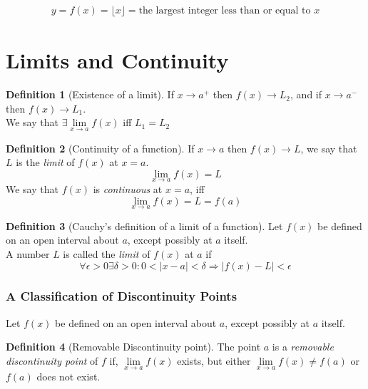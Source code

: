 \documentclass[fleqn]{article}
\theoremstyle{definition}
\newtheorem{definition}{Definition}
\theoremstyle{theorem}
\theoremstyle{remark}
\begin{document}
\begin{align}
	y = f(x) = \lfloor x \rfloor = \text{the largest integer less than or equal to }x
\end{align}

\newpage
\part{Limits and Continuity}

\begin{definition}[Existence of a limit]
	If $x \rightarrow a^+$ then $f(x) \rightarrow L_2$, and if $x \rightarrow a^-$ then $f(x) \rightarrow L_1$.\\
	We say that $\exists \lim\limits_{x \rightarrow a} f(x)$ iff $L_1 = L_2$
\end{definition}

\begin{definition}[Continuity of a function]
	If $x \rightarrow a$ then $f(x) \rightarrow L$, we say that $L$ is the \emph{limit} of $f(x)$ at $x = a$.
	\begin{equation*}
		\lim\limits_{x \rightarrow a} f(x) = L
	\end{equation*}
	We say that $f(x)$ is \emph{continuous} at $x = a$, iff
	\begin{equation*}
		\lim\limits_{x \rightarrow a} f(x) = L = f(a)
	\end{equation*}
\end{definition}

\begin{definition}[Cauchy's definition of a limit of a function]
	Let $f(x)$ be defined on an open interval about $a$, except possibly at $a$ itself.\\
	A number $L$ is called the \emph{limit} of $f(x)$ at $a$ if
	\begin{equation}
		\forall \epsilon > 0 \exists \delta > 0 : 0 < |x - a| < \delta \Rightarrow |f(x) - L| < \epsilon
	\end{equation}
\end{definition}

\section{A Classification of Discontinuity Points}

Let $f(x)$ be defined on an open interval about $a$, except possibly at $a$ itself.

\begin{definition}[Removable Discontinuity point]
	The point $a$ is a \emph{removable discontinuity point} of $f$ if, $\lim\limits_{x \rightarrow a} f(x)$ exists, but either $\lim\limits_{x \rightarrow a} f(x) \neq f(a)$ or $f(a)$ does not exist.
\end{definition}
\end{document}

